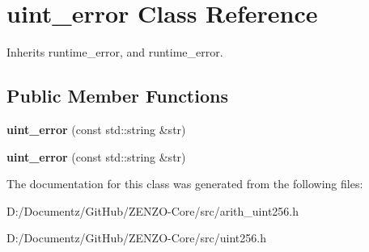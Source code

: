 \hypertarget{classuint__error}{}\section{uint\+\_\+error Class Reference}
\label{classuint__error}


Inherits runtime\+\_\+error, and runtime\+\_\+error.

\subsection*{Public Member Functions}
\begin{DoxyCompactItemize}
\item 
\mbox{\label{classuint__error_a3d37e73d7d585ede158ebba7d32352c3}} 
{\bfseries uint\+\_\+error} (const std\+::string \&str)
\item 
\mbox{\label{classuint__error_a3d37e73d7d585ede158ebba7d32352c3}} 
{\bfseries uint\+\_\+error} (const std\+::string \&str)
\end{DoxyCompactItemize}


The documentation for this class was generated from the following files\+:\begin{DoxyCompactItemize}
\item 
D\+:/\+Documentz/\+Git\+Hub/\+Z\+E\+N\+Z\+O-\/\+Core/src/arith\+\_\+uint256.\+h\item 
D\+:/\+Documentz/\+Git\+Hub/\+Z\+E\+N\+Z\+O-\/\+Core/src/uint256.\+h\end{DoxyCompactItemize}
